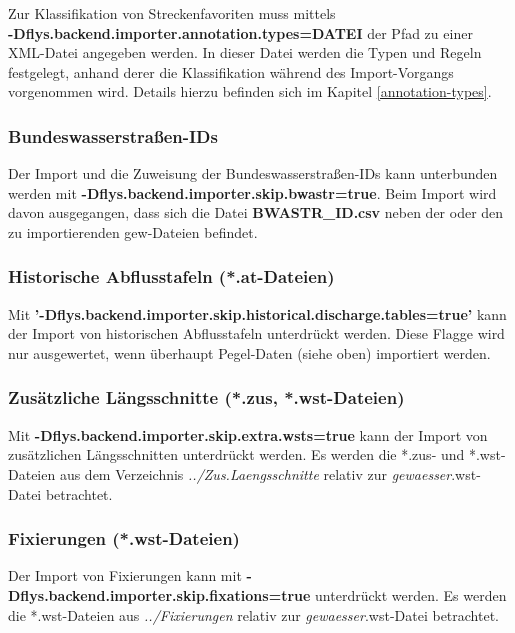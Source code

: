 Zur Klassifikation von Streckenfavoriten muss mittels\\
\textbf{-Dflys.backend.importer.annotation.types=DATEI} der Pfad zu einer
XML-Datei angegeben werden. In dieser Datei werden die Typen und Regeln
festgelegt, anhand derer die Klassifikation während des Import-Vorgangs
vorgenommen wird. Details hierzu befinden sich im Kapitel \ref{annotation-types}.

\subsubsection{Bundeswasserstraßen-IDs}
Der Import und die Zuweisung der Bundeswasserstraßen-IDs kann unterbunden werden
mit \textbf{-Dflys.backend.importer.skip.bwastr=true}.
Beim Import wird davon ausgegangen, dass sich die Datei \textbf{BWASTR\_ID.csv}
neben der oder den zu importierenden gew-Dateien befindet.

\subsubsection{Historische Abflusstafeln (*.at-Dateien)}
Mit \textbf{'-Dflys.backend.importer.skip.historical.discharge.tables=true'}
kann der Import von historischen Abflusstafeln
unterdrückt werden. Diese Flagge wird nur ausgewertet, wenn überhaupt
Pegel-Daten (siehe oben) importiert werden.


\subsubsection{Zusätzliche Längsschnitte (*.zus, *.wst-Dateien)}
Mit \textbf{-Dflys.backend.importer.skip.extra.wsts=true} kann
der Import von zusätzlichen Längs\-schnitten
unterdrückt werden. Es werden die *.zus- und *.wst-Dateien aus dem Verzeichnis
\textit{../Zus.Laengsschnitte} relativ zur
\textit{gewaesser}.wst-Datei betrachtet.

\subsubsection{Fixierungen (*.wst-Dateien)}
Der Import von Fixierungen kann mit \textbf{-Dflys.backend.importer.skip.fixations=true}
unterdrückt werden. Es werden die *.wst-Dateien aus
\textit{../Fixierungen} relativ zur \textit{gewaesser}.wst-Datei betrachtet.

